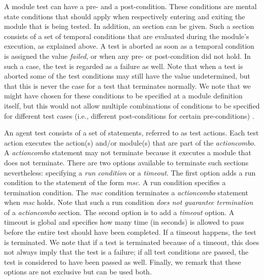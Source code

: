 \documentclass{article}
\begin{document}
A module test can have a pre- and a post-condition. These conditions are mental state conditions that should apply when respectively entering and exiting the module that is being tested. In addition, an \inp section can be given. Such a section consists of a set of temporal conditions that are evaluated during the module's execution, as explained above. A test is aborted as soon as a temporal condition is assigned the value \textit{failed}, or when any pre- or post-condition did not hold. In such a case, the test is regarded as a failure as well. Note that when a test is aborted some of the test conditions may still have the value undetermined, but that this is never the case for a test that terminates normally. We note that we might have chosen for these conditions to be specified at a module definition itself, but this would not allow multiple combinations of conditions to be specified for different test cases (i.e., different post-conditions for certain pre-conditions) .

An agent test consists of a set of \dop statements, referred to as test actions. Each test action executes the action(s) and/or module(s) that are part of the \textit{actioncombo}. A \dop \textit{actioncombo} statement may not terminate because it executes a module that does not terminate. There are two options available to terminate such sections nevertheless: specifying a \textit{run condition} or a \textit{timeout}. The first option adds a run condition to the statement of the form \until \textit{msc}. A run condition specifies a termination condition. The \until \textit{msc} condition terminates a \dop \textit{actioncombo} statement when \textit{msc} holds. Note that such a run condition \textit{does not guarantee termination} of a \dop \textit{actioncombo} section. The second option is to add a \textit{timeout} option. A timeout is global and specifies how many time (in seconds) is allowed to pass before the entire test should have been completed. If a timeout happens, the test is terminated. We note that if a test is terminated because of a timeout, this does not always imply that the test is a failure; if all test conditions are passed, the test is considered to have been passed as well. Finally, we remark that these options are not exclusive but can be used both.
\end{document}
